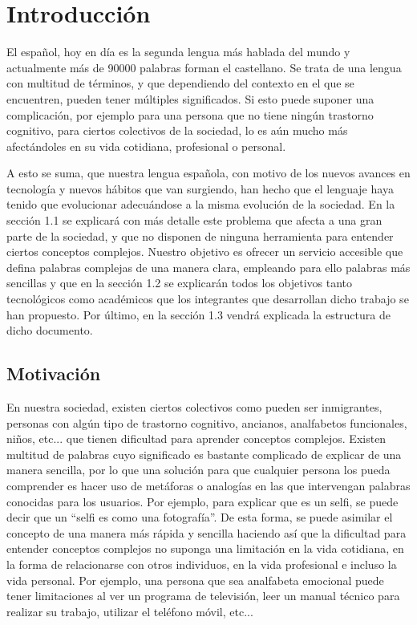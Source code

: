 \chapter{Introducción}
\label{cap:introduccion}


El español, hoy en día es la segunda lengua más hablada del mundo y actualmente más de 90000 palabras forman el castellano. 
Se trata de una lengua con multitud de términos, y que dependiendo del contexto en el que se encuentren, pueden tener múltiples significados.
Si esto puede suponer una complicación, por ejemplo para una persona que no tiene ningún trastorno cognitivo, para ciertos colectivos de la sociedad, lo es aún mucho más afectándoles en su vida cotidiana, profesional o personal. 

A esto se suma, que nuestra lengua española, con motivo de los nuevos avances en tecnología y nuevos hábitos que van surgiendo, han hecho que el lenguaje haya tenido que evolucionar adecuándose a la misma evolución de la sociedad.
En la sección 1.1 se explicará con más detalle este problema que afecta a una gran parte de la sociedad, y que no disponen de ninguna herramienta para entender ciertos conceptos complejos. 
Nuestro objetivo es ofrecer un servicio accesible que defina palabras complejas de una manera clara, empleando para ello palabras más sencillas y que en la sección 1.2 se explicarán todos los objetivos tanto tecnológicos como académicos que los integrantes que desarrollan dicho trabajo se han propuesto.
Por último, en la sección 1.3 vendrá explicada la estructura de dicho documento.



	


\section{Motivación}
\label{cap:sec:motivacion}

En nuestra sociedad, existen ciertos colectivos como pueden ser inmigrantes, personas con algún tipo de trastorno cognitivo, ancianos, analfabetos funcionales, niños, etc... que tienen dificultad para aprender conceptos complejos. 
Existen multitud de palabras cuyo significado es bastante complicado de explicar de una manera sencilla, por lo que una solución para que cualquier persona los pueda comprender es hacer uso de metáforas o analogías en las que intervengan palabras conocidas para los usuarios. Por ejemplo, para explicar que es un selfi, se puede decir que un ``selfi es como una fotografía''. De esta forma, se puede asimilar el concepto de una manera más rápida y sencilla haciendo así que la dificultad para entender conceptos complejos no suponga una limitación en la vida cotidiana, en la forma de relacionarse con otros individuos, en la vida profesional e incluso la vida personal. 
Por ejemplo, una persona que sea analfabeta emocional puede tener limitaciones al ver un programa de televisión, leer un manual técnico para realizar su trabajo, utilizar el teléfono móvil, etc...

